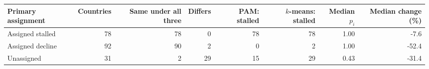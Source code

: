 \begin{tabular}{lrrrrrrr}
\toprule
Primary assignment & Countries & Same under all three & Differs & PAM: stalled & $k$-means: stalled & Median $p_i$ & Median change (\%) \\
\midrule
Assigned stalled & 78 & 78 &  0 & 78 & 78 & 1.00 & -7.6 \\
Assigned decline & 92 & 90 &  2 &  0 &  2 & 1.00 & -52.4 \\
Unassigned & 31 &  2 & 29 & 15 & 29 & 0.43 & -31.4 \\
\bottomrule
\end{tabular}
